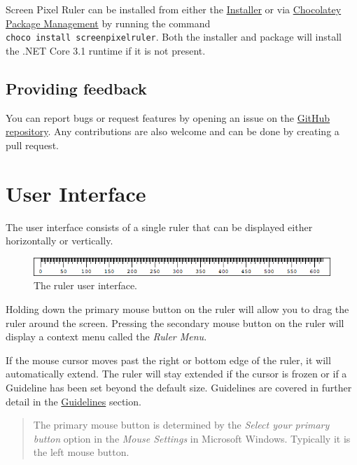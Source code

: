 \documentclass[
]{book}
\begin{document}
Screen Pixel Ruler can be installed from either the \href{https://github.com/Cossey/ScreenPixelRuler2/releases}{Installer} or via \href{https://chocolatey.org}{Chocolatey Package Management} by running the command \texttt{choco\ install\ screenpixelruler}.
Both the installer and package will install the .NET Core 3.1 runtime if it is not present.

\hypertarget{providing-feedback}{%
\section{Providing feedback}\label{providing-feedback}}

You can report bugs or request features by opening an issue on the \href{https://github.com/Cossey/ScreenPixelRuler2}{GitHub repository}.
Any contributions are also welcome and can be done by creating a pull request.

\hypertarget{ui}{%
\chapter{User Interface}\label{ui}}

The user interface consists of a single ruler that can be displayed either horizontally or vertically.

\begin{figure}
\centering
\includegraphics{images/ruler.png}
\caption{\label{fig:unnamed-chunk-1}The ruler user interface.}
\end{figure}

Holding down the primary mouse button on the ruler will allow you to drag the ruler around the screen.
Pressing the secondary mouse button on the ruler will display a context menu called the \emph{Ruler Menu}.

If the mouse cursor moves past the right or bottom edge of the ruler, it will automatically extend.
The ruler will stay extended if the cursor is frozen or if a Guideline has been set beyond the default size.
Guidelines are covered in further detail in the \protect\hyperlink{guidelines}{Guidelines} section.

\begin{quote}
The primary mouse button is determined by the \emph{Select your primary button} option in the \emph{Mouse Settings} in Microsoft Windows.
Typically it is the left mouse button.
\end{quote}
\end{document}

